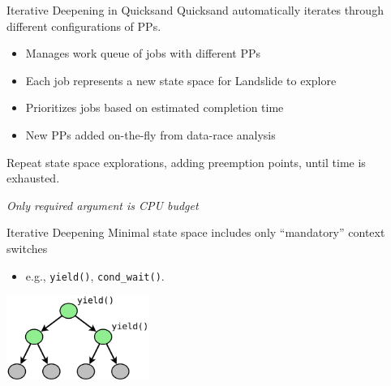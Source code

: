 \documentclass[xcolor=dvipsnames]{beamer}
\begin{document}
\begin{frame}{Iterative Deepening in Quicksand}
	Quicksand automatically iterates through different configurations of PPs.
	\begin{itemize}
		\item Manages work queue of jobs with different PPs
		\item Each job represents a new state space for Landslide to explore
		\item Prioritizes jobs based on estimated completion time
		\item New PPs added on-the-fly from data-race analysis
	\end{itemize}
	\linegap

	Repeat state space explorations, adding preemption points, until time is exhausted.

	\linegap
	{\em Only required argument is CPU budget}
\end{frame}

\begin{frame}{Iterative Deepening}
	Minimal state space includes only ``mandatory'' context switches
	\begin{itemize}
		\item e.g., {\tt yield()}, {\tt cond\_wait()}.
	\end{itemize}
	\vspace{0.29in}
	\begin{center}
		\includegraphics[width=0.35\textwidth]{tree0.pdf}
	\end{center}
\end{frame}
\end{document}
